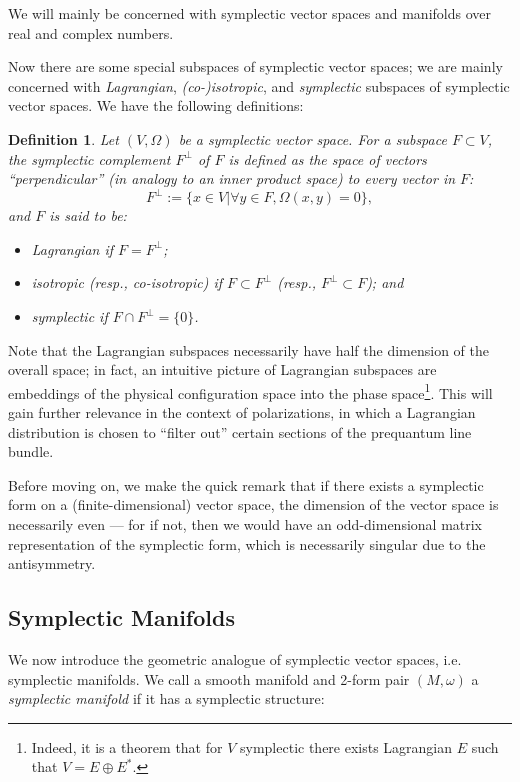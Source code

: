 \documentclass{tufte-handout}
\newtheorem{defn}{Definition}
\begin{document}
We will mainly be concerned with symplectic vector spaces and manifolds over real and complex numbers.

Now there are some special subspaces of symplectic vector spaces; we are mainly concerned with \emph{Lagrangian}, \emph{(co-)isotropic}, and \emph{symplectic} subspaces of symplectic vector spaces. We have the following definitions:
\begin{defn}
Let $(V,\Omega)$ be a symplectic vector space. For a subspace $F \subset V$, the \emph{symplectic complement} $F^\perp$ of $F$ is defined as the space of vectors ``perpendicular'' (in analogy to an inner product space) to every vector in $F$:
$$
F^{\perp} := \{x \in V | \forall y \in F, \Omega(x,y) = 0 \},
$$
and $F$ is said to be:
\begin{itemize}
\item \emph{Lagrangian} if $F = F^\perp$;

\item \emph{isotropic} (resp., \emph{co-isotropic}) if $F \subset F^\perp$ (resp., $F^\perp \subset F$); and

\item \emph{symplectic} if $F \cap F^\perp = \{0\}$.
\end{itemize}
\end{defn}
Note that the Lagrangian subspaces necessarily have half the dimension of the overall space; in fact, an intuitive picture of Lagrangian subspaces are embeddings of the physical configuration space into the phase space\footnote{Indeed, it is a theorem that for $V$ symplectic there exists Lagrangian $E$ such that $V = E \oplus E^*$.}. This will gain further relevance in the context of polarizations, in which a Lagrangian distribution is chosen to ``filter out'' certain sections of the prequantum line bundle.

Before moving on, we make the quick remark that if there exists a symplectic form on a (finite-dimensional) vector space, the dimension of the vector space is necessarily even --- for if not, then we would have an odd-dimensional matrix representation of the symplectic form, which is necessarily singular due to the antisymmetry.

\subsection{Symplectic Manifolds}
We now introduce the geometric analogue of symplectic vector spaces, i.e. symplectic manifolds. We call a smooth manifold and 2-form pair $(M,\omega)$ a \emph{symplectic manifold} if it has a symplectic structure:
\end{document}
